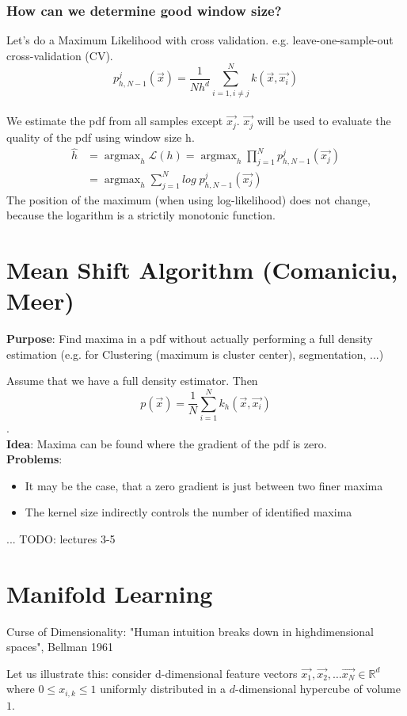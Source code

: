 \documentclass[a4paper]{article}
\DeclareMathOperator*{\argmax}{argmax} %
\begin{document}
\subsubsection*{How can we determine good window size?}
Let's do a Maximum Likelihood with cross validation. e.g. leave-one-sample-out cross-validation (CV).
\[ p_{h, N-1}^j (\vec{x}) = \frac{1}{N h^d} \sum_{i=1, i \neq j}^{N} k(\vec{x}, \vec{x_i}) \] \\
We estimate the pdf from all samples except \(\vec{x_j}\). \(\vec{x_j}\) will be used to evaluate the quality of the pdf using window size h.
\begin{align*}
\hat{h} &= \argmax_h \mathcal{L}(h) = \argmax_h \prod_{j=1}^{N} p_{h, N-1}^j (\vec{x_j})\\
&= \argmax_h \sum\limits_{j=1}^{N} log \; p_{h, N-1}^j (\vec{x_j})
\end{align*}
The position of the maximum (when using log-likelihood) does not change, because the logarithm is a strictily monotonic function.

\section{Mean Shift Algorithm (Comaniciu, Meer)}
\textbf{Purpose}: Find maxima in a pdf without actually performing a full density estimation (e.g. for Clustering (maximum is cluster center), segmentation, ...)

Assume that we have a full density estimator. Then
\[p(\vec{x}) = \frac{1}{N} \sum\limits_{i=1}^N k_h (\vec{x}, \vec{x_i}) \].\\
\textbf{Idea}: Maxima can be found where the gradient of the pdf is zero.\\
\textbf{Problems}:
\begin{itemize}
    \item
        It may be the case, that a zero gradient is just between two finer maxima
    \item
        The kernel size indirectly controls the number of identified maxima
\end{itemize}
... TODO: lectures 3-5

\section{Manifold Learning}
Curse of Dimensionality: "Human intuition breaks down in highdimensional spaces", Bellman 1961

Let us illustrate this: consider d-dimensional feature vectors $\vec{x_1}, \vec{x_2}, \dots \vec{x_N} \in \mathbb{R}^d$ where $0 \leq x_{i, k} \leq 1$ uniformly distributed in a $d$-dimensional hypercube of volume $1$.
\end{document}
